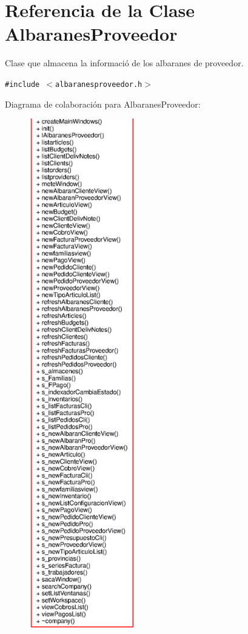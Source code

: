 \section{Referencia de la Clase Albaranes\-Proveedor}
\label{classAlbaranesProveedor}
Clase que almacena la informaci\'{o} de los albaranes de proveedor.  


{\tt \#include $<$albaranesproveedor.h$>$}

Diagrama de colaboraci\'{o}n para Albaranes\-Proveedor:\begin{figure}[H]
\begin{center}
\leavevmode
\includegraphics[width=131pt]{classAlbaranesProveedor__coll__graph}
\end{center}
\end{figure}
